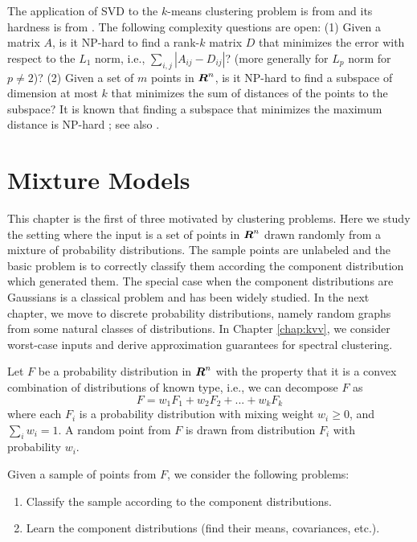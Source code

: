 \documentclass{book}
\numberwithin{exercise}{chapter}
\begin{document}
The application of SVD to the $k$-means clustering problem is from \cite{DFKVV04} and its hardness is from \cite{DP09}.
The following complexity questions are open:
(1) Given a matrix $A$, is it NP-hard to find a rank-$k$ matrix $D$ that minimizes the error with respect to the $L_1$ norm, i.e., $\sum_{i,j} |A_{ij} - D_{ij}|$? (more generally for $L_p$ norm for $p \neq 2$)?
(2) Given a set of $m$ points in $\mbox{\mbox{\boldmath $R$}}^n$, is it NP-hard to find a subspace of dimension at most $k$ that minimizes the sum of distances of the points to the subspace?
It is known that finding a subspace that minimizes the maximum distance is NP-hard \cite{Megiddo1982}; see also \cite{HV02}.





\chapter{Mixture Models}\label{chap:mixtures}

This chapter is the first of three motivated by clustering problems. Here we study the setting where the input is a set of points in $\mbox{\mbox{\boldmath $R$}}^n$ drawn randomly from a mixture of probability distributions. The sample points are unlabeled and the basic problem is to correctly classify them according the component distribution which generated them. The special case when the component distributions are Gaussians is a classical problem and has been widely studied. In the next chapter, we move to discrete probability distributions, namely random graphs from some natural classes of distributions. In Chapter \ref{chap:kvv}, we consider worst-case inputs and derive approximation guarantees for spectral clustering.

Let $F$ be a probability distribution in $\mbox{\mbox{\boldmath $R$}}^n$ with the property that
 it is a convex combination of
 distributions of known type, i.e., we can decompose $F$ as
$$F = w_1F_1 + w_2F_2 + ... + w_kF_k$$
where each $F_i$ is a probability distribution with mixing weight $w_i
\ge 0$, and $\sum_i{w_i} = 1$.  A random point from $F$ is drawn
from distribution $F_i$ with probability $w_i$.

Given a sample of points from $F$, we consider the following problems:
\begin{enumerate}
\item Classify the sample according to the component distributions.
\item Learn the component distributions
(find their means, covariances, etc.).
\end{enumerate}
\end{document}
